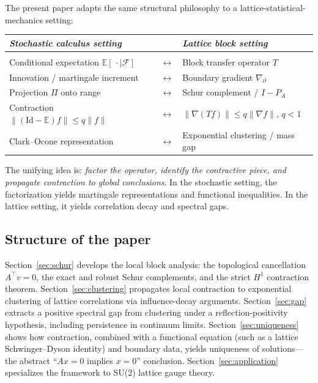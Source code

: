 \documentclass[11pt]{article}
\theoremstyle{definition}
\newcommand{\E}{\mathbb{E}}
\newcommand{\1}{\mathbf{1}}
\newcommand{\cF}{\mathcal{F}}
\newcommand{\norm}[1]{\lVert #1\rVert}
\begin{document}
The present paper adapts the same structural philosophy to a lattice-statistical-mechanics
setting:
\begin{center}
\begin{tabular}{lcl}
\emph{Stochastic calculus setting} && \emph{Lattice block setting}\\[3pt]
\hline\\[-6pt]
Conditional expectation $\E[\,\cdot\mid\cF]$ &$\longleftrightarrow$& Block transfer operator $T$\\[2pt]
Innovation / martingale increment &$\longleftrightarrow$& Boundary gradient $\nabla_\partial$\\[2pt]
Projection $\Pi$ onto range &$\longleftrightarrow$& Schur complement / $I-P_A$\\[2pt]
Contraction $\norm{(\mathrm{Id}-\E)f}\le q\norm{f}$ &$\longleftrightarrow$& $\norm{\nabla(Tf)}\le q\norm{\nabla f}$, $q<1$\\[2pt]
Clark--Ocone representation &$\longleftrightarrow$& Exponential clustering / mass gap
\end{tabular}
\end{center}
The unifying idea is: \emph{factor the operator, identify the contractive piece, and propagate
contraction to global conclusions}.  In the stochastic setting, the factorization yields
martingale representations and functional inequalities.  In the lattice setting, it yields
correlation decay and spectral gaps.

\subsection{Structure of the paper}

Section~\ref{sec:schur} develops the local block analysis: the topological cancellation
$A^\top v=0$, the exact and robust Schur complements, and the strict $H^1$ contraction
theorem.
Section~\ref{sec:clustering} propagates local contraction to exponential clustering
of lattice correlations via influence-decay arguments.
Section~\ref{sec:gap} extracts a positive spectral gap from clustering under a
reflection-positivity hypothesis, including persistence in continuum limits.
Section~\ref{sec:uniqueness} shows how contraction, combined with a functional equation
(such as a lattice Schwinger--Dyson identity) and boundary data, yields uniqueness of
solutions---the abstract ``$Ax=0$ implies $x=0$'' conclusion.
Section~\ref{sec:application} specializes the framework to SU(2) lattice gauge theory.

\end{document}
